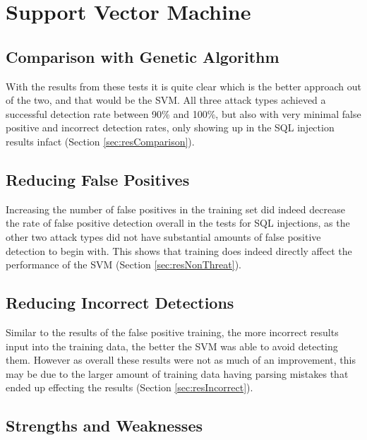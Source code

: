 \section{Support Vector Machine}
\subsection{Comparison with Genetic Algorithm}

With the results from these tests it is quite clear which is the better approach out of the two, and that would be the SVM.  All three attack types achieved a successful detection rate between 90\% and 100\%, but also with very minimal false positive and incorrect detection rates, only showing up in the SQL injection results infact (Section \ref{sec:resComparison}).

\subsection{Reducing False Positives}

Increasing the number of false positives in the training set did indeed decrease the rate of false positive detection overall in the tests for SQL injections, as the other two attack types did not have substantial amounts of false positive detection to begin with.  This shows that training does indeed directly affect the performance of the SVM (Section \ref{sec:resNonThreat}).

\subsection{Reducing Incorrect Detections}

Similar to the results of the false positive training, the more incorrect results input into the training data, the better the SVM was able to avoid detecting them.  However as overall these results were not as much of an improvement, this may be due to the larger amount of training data having parsing mistakes that ended up effecting the results (Section \ref{sec:resIncorrect}).

\subsection{Strengths and Weaknesses} \label{sec:svmDisadvantages}

